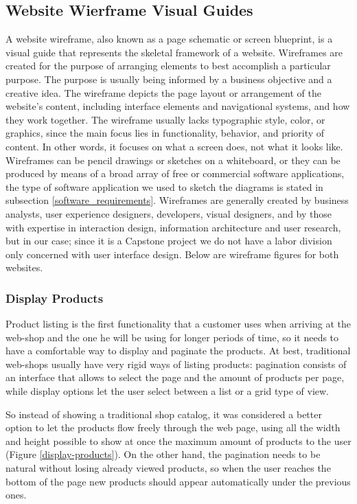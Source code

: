 \subsection{Website Wierframe Visual Guides}
A website wireframe, also known as a page schematic or screen blueprint, is a visual guide that represents the skeletal framework of a website. Wireframes are created for the purpose of arranging elements to best accomplish a particular purpose. The purpose is usually being informed by a business objective and a creative idea. The wireframe depicts the page layout or arrangement of the website's content, including interface elements and navigational systems, and how they work together. The wireframe usually lacks typographic style, color, or graphics, since the main focus lies in functionality, behavior, and priority of content. In other words, it focuses on what a screen does, not what it looks like. Wireframes can be pencil drawings or sketches on a whiteboard, or they can be produced by means of a broad array of free or commercial software applications, the type of software application we used to sketch the diagrams is stated in subsection \ref{software_requirements}. Wireframes are generally created by business analysts, user experience designers, developers, visual designers, and by those with expertise in interaction design, information architecture and user research, but in our case; since it is a Capstone project we do not have a labor division only concerned with user interface design. Below are wireframe figures for both websites.

\subsubsection{Display Products}
Product listing is the first functionality that a customer uses when arriving at the web-shop and the one he will be using for longer periods of time, so it needs to have a comfortable way to display and paginate the products. At best, traditional web-shops usually have very rigid ways of listing products: pagination consists of an interface that allows to select the page and the amount of products per page, while display options let the user select between a list or a grid type of view.

So instead of showing a traditional shop catalog, it was considered a better option to let the products flow freely through the web page, using all the width and height possible to show at once the maximum amount of products to the user (Figure \ref{display-products}). On the other hand, the pagination needs to be natural without losing already viewed products, so when the user reaches the bottom of the page new products should appear automatically under the previous ones.

